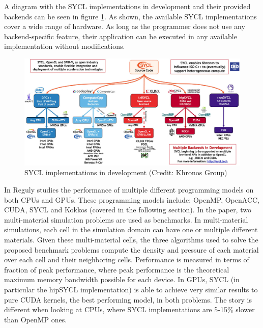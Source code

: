 A diagram with the SYCL implementations in development and their provided backends can be seen in figure \ref{fig:sycl-implementations}. As shown, the available SYCL implementations cover a wide range of hardware. As long as the programmer does not use any backend-specific feature, their application can be executed in any available implementation without modifications.

\begin{figure}[ht]
    \centering
    \includegraphics[width=\textwidth]{img/sycl-implementations.png}
    \captionsetup{justification=centering}
    \caption{SYCL implementations in development (Credit: Khronos Group)}
    \label{fig:sycl-implementations}
\end{figure}

In \cite{performance_portability_multimaterial_kernels} Reguly studies the performance of multiple different programming models on both CPUs and GPUs. These programming models include: OpenMP, OpenACC, CUDA, SYCL and Kokkos (covered in the following section). In the paper, two multi-material simulation problems are used as benchmarks. In multi-material simulations, each cell in the simulation domain can have one or multiple different materials. Given these multi-material cells, the three algorithms used to solve the proposed benchmark problems compute the density and pressure of each material over each cell and their neighboring cells. Performance is measured in terms of fraction of peak performance, where peak performance is the theoretical maximum memory bandwidth possible for each device. In GPUs, SYCL (in particular the hipSYCL implementation) is able to achieve very similar results to pure CUDA kernels, the best performing model, in both problems. The story is different when looking at CPUs, where SYCL implementations are 5-15\% slower than OpenMP ones.

